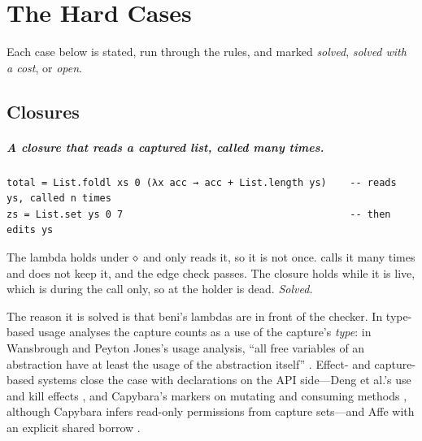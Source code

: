 \chapter{The Hard Cases}
\label{sec:hard}

Each case below is stated, run through the rules, and marked \emph{solved}, \emph{solved with a
cost}, or \emph{open}.

\section{Closures}
\label{sec:hard-closures}

\paragraph{A closure that reads a captured list, called many times.}
\begin{Verbatim}
total = List.foldl xs 0 (λx acc → acc + List.length ys)    -- reads ys, called n times
zs = List.set ys 0 7                                       -- then edits ys
\end{Verbatim}
The lambda holds  under $\diamond$ and only reads it, so it is not once.  calls it many
times and does not keep it, and the edge check passes. The closure holds  while it is live,
which is during the  call only, so at  the holder is dead.
\emph{Solved.}

The reason it is solved is that beni's lambdas are in front of the checker. In type-based usage
analyses the capture counts as a use of the capture's \emph{type}: in Wansbrough and Peyton Jones's
usage analysis, ``all free variables of an abstraction have at least the usage of the abstraction
itself'' \citep[\S6.1]{wansbrough1999once}. Effect- and capture-based systems close the case with
declarations on the API side---Deng et al.'s use and kill effects \citep{deng2025capture}, and
Capybara's markers on mutating and consuming methods \citep[\S6.1]{xu2026capybara}, although Capybara
infers read-only permissions from capture sets---and Affe with an explicit shared borrow 
\citep[\S3.3]{radanne2020kindly}.

